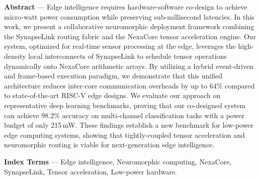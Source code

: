 \begin{abstractbox}
\noindent\textbf{Abstract} ---
Edge intelligence requires hardware-software co-design to achieve micro-watt power consumption while preserving sub-millisecond latencies. In this work, we present a collaborative neuromorphic deployment framework combining the SynapseLink routing fabric and the NexaCore tensor acceleration engine. Our system, optimized for real-time sensor processing at the edge, leverages the high-density local interconnects of SynapseLink to schedule tensor operations dynamically onto NexaCore arithmetic arrays. By utilizing a hybrid event-driven and frame-based execution paradigm, we demonstrate that this unified architecture reduces inter-core communication overheads by up to 64\% compared to state-of-the-art RISC-V edge designs. We evaluate our approach on representative deep learning benchmarks, proving that our co-designed system can achieve 98.2\% accuracy on multi-channel classification tasks with a power budget of only 215\,mW. These findings establish a new benchmark for low-power edge computing systems, showing that tightly-coupled tensor acceleration and neuromorphic routing is viable for next-generation edge intelligence.

\medskip
\noindent\textbf{Index Terms} --- Edge intelligence, Neuromorphic computing, NexaCore, SynapseLink, Tensor acceleration, Low-power hardware.
\end{abstractbox}
